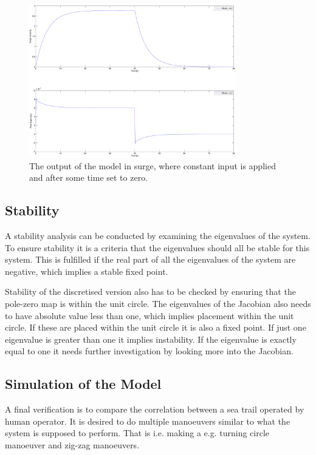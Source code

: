 \begin{figure}
  \includegraphics[width=0.8\textwidth]{fig/modelsurge}
  \caption{The output of the model in surge, where constant input is applied and after some time set to zero.}
  \label{fig:surgevel}
\end{figure}

\subsection{Stability}
A stability analysis can be conducted by examining the eigenvalues of the system. To ensure stability it is a criteria that the eigenvalues should all be stable for this system. This is fulfilled if the real part of all the eigenvalues of the system are negative, which implies a stable fixed point.

Stability of the discretised version also has to be checked by ensuring that the pole-zero map is within the unit circle. The eigenvalues of the Jacobian also needs to have absolute value less than one, which implies placement within the unit circle. If these are placed within the unit circle it is also a fixed point. If just one eigenvalue is greater than one it implies instability. If the eigenvalue is exactly equal to one it needs further investigation by looking more into the Jacobian.

\subsection{Simulation of the Model}
A final verification is to compare the correlation between a sea trail operated by human operator. It is desired to do multiple manoeuvers similar to what the system is supposed to perform. That is i.e. making a e.g. turning circle manoeuver and zig-zag manoeuvers.
